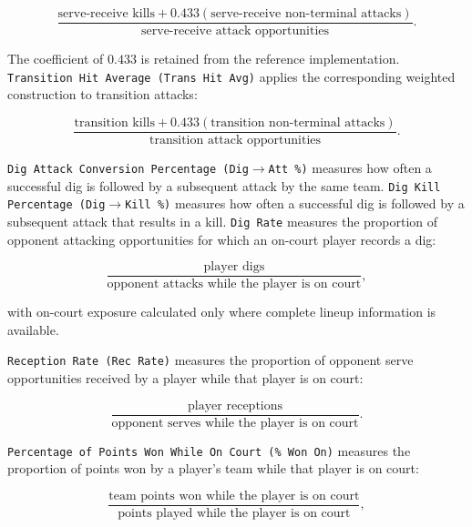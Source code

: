 \documentclass[10pt]{article}
\begin{document}
\[
\frac{
\text{serve-receive kills}
+
0.433(\text{serve-receive non-terminal attacks})
}{
\text{serve-receive attack opportunities}
}.
\]

The coefficient of $0.433$ is retained from the reference implementation.
\texttt{Transition Hit Average (Trans Hit Avg)} applies the corresponding weighted construction to transition attacks:

\[
\frac{
\text{transition kills}
+
0.433(\text{transition non-terminal attacks})
}{
\text{transition attack opportunities}
}.
\]


\texttt{Dig Attack Conversion Percentage (Dig$\rightarrow$Att \%)} measures how often a successful dig is followed by a subsequent attack by the same team.
\texttt{Dig Kill Percentage (Dig$\rightarrow$Kill \%)} measures how often a successful dig is followed by a subsequent attack that results in a kill.
\texttt{Dig Rate} measures the proportion of opponent attacking opportunities for which an on-court player records a dig:

\[
\frac{
\text{player digs}
}{
\text{opponent attacks while the player is on court}
},
\]

with on-court exposure calculated only where complete lineup information is available.

\texttt{Reception Rate (Rec Rate)} measures the proportion of opponent serve opportunities received by a player while that player is on court:

\[
\frac{
\text{player receptions}
}{
\text{opponent serves while the player is on court}
}.
\]

\texttt{Percentage of Points Won While On Court (\% Won On)} measures the proportion of points won by a player's team while that player is on court:

\[
\frac{
\text{team points won while the player is on court}
}{
\text{points played while the player is on court}
},
\]
\end{document}
